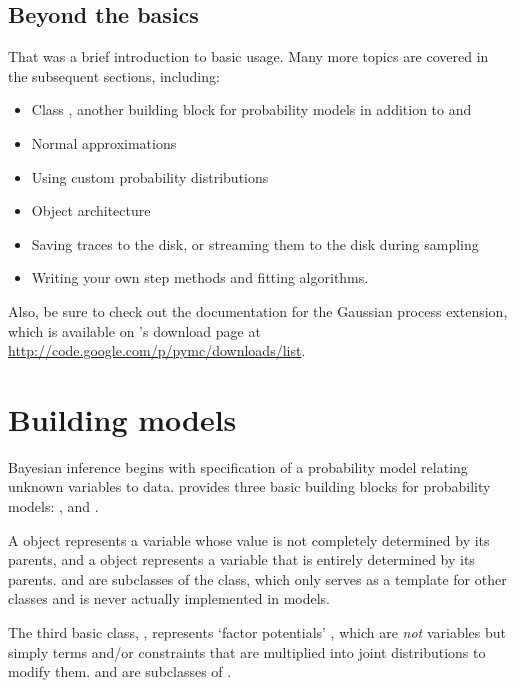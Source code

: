 \documentclass[]{jss}
\begin{document}
\subsection{Beyond the basics}
That was a brief introduction to basic  usage. Many more topics are covered in the subsequent sections, including:
\begin{itemize}
   \item Class , another building block for probability models in addition to  and 
   \item Normal approximations
   \item Using custom probability distributions
   \item Object architecture
   \item Saving traces to the disk, or streaming them to the disk during sampling
   \item Writing your own step methods and fitting algorithms.
\end{itemize}
Also, be sure to check out the documentation for the Gaussian process extension,
which is available on 's
download page at \href{http://code.google.com/p/pymc/downloads/list}{http://code.google.com/p/pymc/downloads/list}.



\section{Building models}
\label{chap:modelbuilding}

Bayesian inference begins with specification of a probability model relating unknown variables to data.  provides three basic building blocks for probability models: ,  and .

A  object represents a variable whose value is not completely determined by its parents, and a  object represents a variable that is entirely determined by its parents.  and  are subclasses of the  class, which only serves as a template for other classes and is never actually implemented in models.

The third basic class, , represents `factor potentials' \citep{dawidmarkov,Jordan:2004p5439}, which are \emph{not} variables but simply terms and/or constraints that are multiplied into joint distributions to modify them.  and  are subclasses of .
\end{document}
